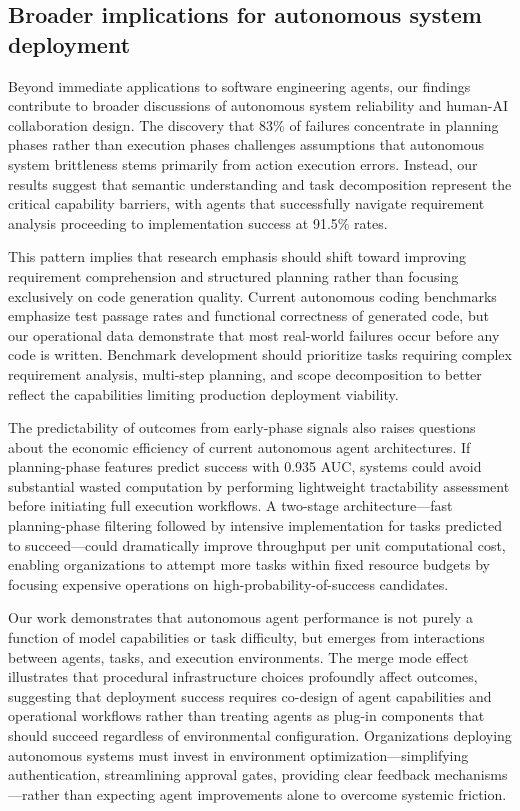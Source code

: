 \documentclass[]{article}
\begin{document}
\subsection{Broader implications for autonomous system deployment}

Beyond immediate applications to software engineering agents, our findings contribute to broader discussions of autonomous system reliability and human-AI collaboration design. The discovery that 83\% of failures concentrate in planning phases rather than execution phases challenges assumptions that autonomous system brittleness stems primarily from action execution errors. Instead, our results suggest that semantic understanding and task decomposition represent the critical capability barriers, with agents that successfully navigate requirement analysis proceeding to implementation success at 91.5\% rates.

This pattern implies that research emphasis should shift toward improving requirement comprehension and structured planning rather than focusing exclusively on code generation quality. Current autonomous coding benchmarks emphasize test passage rates and functional correctness of generated code, but our operational data demonstrate that most real-world failures occur before any code is written. Benchmark development should prioritize tasks requiring complex requirement analysis, multi-step planning, and scope decomposition to better reflect the capabilities limiting production deployment viability.

The predictability of outcomes from early-phase signals also raises questions about the economic efficiency of current autonomous agent architectures. If planning-phase features predict success with 0.935 AUC, systems could avoid substantial wasted computation by performing lightweight tractability assessment before initiating full execution workflows. A two-stage architecture—fast planning-phase filtering followed by intensive implementation for tasks predicted to succeed—could dramatically improve throughput per unit computational cost, enabling organizations to attempt more tasks within fixed resource budgets by focusing expensive operations on high-probability-of-success candidates.

Our work demonstrates that autonomous agent performance is not purely a function of model capabilities or task difficulty, but emerges from interactions between agents, tasks, and execution environments. The merge mode effect illustrates that procedural infrastructure choices profoundly affect outcomes, suggesting that deployment success requires co-design of agent capabilities and operational workflows rather than treating agents as plug-in components that should succeed regardless of environmental configuration. Organizations deploying autonomous systems must invest in environment optimization—simplifying authentication, streamlining approval gates, providing clear feedback mechanisms—rather than expecting agent improvements alone to overcome systemic friction.
\end{document}
